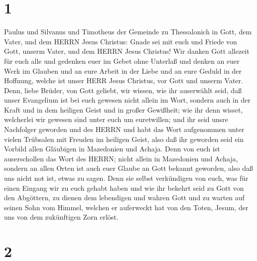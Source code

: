 \hypertarget{section}{%
\section{1}\label{section}}

 Paulus und Silvanus und Timotheus der Gemeinde zu
Thessalonich in Gott, dem Vater, und dem HERRN Jesus Christus: Gnade sei
mit euch und Friede von Gott, unserm Vater, und dem HERRN Jesus
Christus!  Wir danken Gott allezeit für euch alle und
gedenken euer im Gebet ohne Unterlaß  und denken an euer
Werk im Glauben und an eure Arbeit in der Liebe und an eure Geduld in
der Hoffnung, welche ist unser HERR Jesus Christus, vor Gott und unserm
Vater.  Denn, liebe Brüder, von Gott geliebt, wir wissen,
wie ihr auserwählt seid,  daß unser Evangelium ist bei euch
gewesen nicht allein im Wort, sondern auch in der Kraft und in dem
heiligen Geist und in großer Gewißheit; wie ihr denn wisset, welcherlei
wir gewesen sind unter euch um euretwillen;  und ihr seid
unsre Nachfolger geworden und des HERRN und habt das Wort aufgenommen
unter vielen Trübsalen mit Freuden im heiligen Geist,  also
daß ihr geworden seid ein Vorbild allen Gläubigen in Mazedonien und
Achaja.  Denn von euch ist auserschollen das Wort des HERRN;
nicht allein in Mazedonien und Achaja, sondern an allen Orten ist auch
euer Glaube an Gott bekannt geworden, also daß uns nicht not ist, etwas
zu sagen.  Denn sie selbst verkündigen von euch, was für
einen Eingang wir zu euch gehabt haben und wie ihr bekehrt seid zu Gott
von den Abgöttern, zu dienen dem lebendigen und wahren Gott
 und zu warten auf seinen Sohn vom Himmel, welchen er
auferweckt hat von den Toten, Jesum, der uns von dem zukünftigen Zorn
erlöst.

\hypertarget{section-1}{%
\section{2}\label{section-1}}

